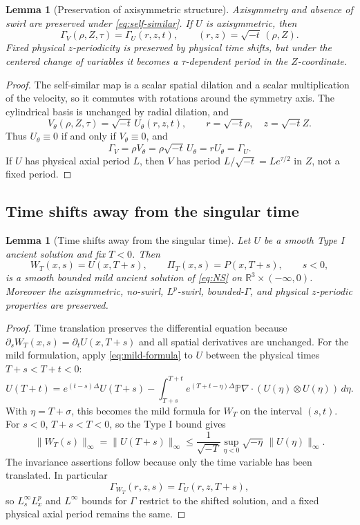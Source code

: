 \documentclass[11pt]{amsart}
\theoremstyle{plain}
\newtheorem{lemma}[theorem]{Lemma}
\theoremstyle{definition}
\theoremstyle{remark}
\numberwithin{equation}{section}
\begin{document}
\begin{lemma}[Preservation of axisymmetric structure]
\label{lem:structure-preserved}
Axisymmetry and absence of swirl are preserved under
\eqref{eq:self-similar}.  If \(U\) is axisymmetric, then
\[
   \Gamma_V(\rho,Z,\tau)=\Gamma_U(r,z,t),
   \qquad
   (r,z)=\sqrt{-t}\,(\rho,Z).
\]
Fixed physical \(z\)-periodicity is preserved by physical time shifts, but
under the centered change of variables it becomes a \(\tau\)-dependent period
in the \(Z\)-coordinate.
\end{lemma}

\begin{proof}
The self-similar map is a scalar spatial dilation and a scalar multiplication
of the velocity, so it commutes with rotations around the symmetry axis.
The cylindrical basis is unchanged by radial dilation, and
\[
   V_\theta(\rho,Z,\tau)
   =
   \sqrt{-t}\,U_\theta(r,z,t),
   \qquad
   r=\sqrt{-t}\rho,\quad z=\sqrt{-t}Z .
\]
Thus \(U_\theta\equiv0\) if and only if \(V_\theta\equiv0\), and
\[
   \Gamma_V=\rho V_\theta
   =
   \rho\sqrt{-t}\,U_\theta
   =
   rU_\theta
   =
   \Gamma_U .
\]
If \(U\) has physical axial period \(L\), then \(V\) has period
\(L/\sqrt{-t}=Le^{\tau/2}\) in \(Z\), not a fixed period.
\end{proof}

\subsection{Time shifts away from the singular time}

\begin{lemma}[Time shifts away from the singular time]
\label{lem:time-shift}
Let \(U\) be a smooth Type I ancient solution and fix \(T<0\).  Then
\[
   W_T(x,s)=U(x,T+s),\qquad \Pi_T(x,s)=P(x,T+s),\qquad s<0,
\]
is a smooth bounded mild ancient solution of \eqref{eq:NS} on
\(\mathbb R^3\times(-\infty,0)\).  Moreover the axisymmetric, no-swirl,
\(L^p\)-swirl, bounded-\(\Gamma\), and physical \(z\)-periodic properties are
preserved.
\end{lemma}

\begin{proof}
Time translation preserves the differential equation because
\(\partial_sW_T(x,s)=\partial_tU(x,T+s)\) and all spatial derivatives are
unchanged.  For the mild formulation, apply \eqref{eq:mild-formula} to \(U\)
between the physical times \(T+s<T+t<0\):
\[
   U(T+t)=e^{(t-s)\Delta}U(T+s)
   -\int_{T+s}^{T+t}e^{(T+t-\eta)\Delta}\mathbb P\nabla\cdot
      (U(\eta)\otimes U(\eta))\,d\eta .
\]
With \(\eta=T+\sigma\), this becomes the mild formula for \(W_T\) on the
interval \((s,t)\).  For \(s<0\), \(T+s<T<0\), so the Type I bound gives
\[
   \|W_T(s)\|_\infty
   =
   \|U(T+s)\|_\infty
   \le
   \frac1{\sqrt{-T}}
   \sup_{\eta<0}\sqrt{-\eta}\,\|U(\eta)\|_\infty .
\]
The invariance assertions follow because only the time variable has been
translated.  In particular
\[
   \Gamma_{W_T}(r,z,s)=\Gamma_U(r,z,T+s),
\]
so \(L_s^\infty L_x^p\) and \(L^\infty\) bounds for \(\Gamma\) restrict to the
shifted solution, and a fixed physical axial period remains the same.
\end{proof}
\end{document}
